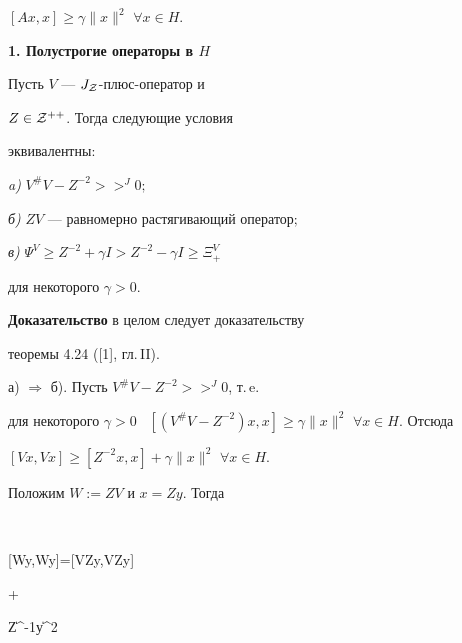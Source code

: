 $[Ax,x]\geq\gamma\| x\|^{2}$ $\forall x\in H$.


\bigskip





\begin{center}


{\bf 1. Полустрогие операторы в $H$}


\end{center}





\begin{thm}


Пусть $V$ --- $J_{\cal Z}$-плюс-оператор и


$Z\in {\cal Z}^{++}$. Тогда следующие условия


эквивалентны\/${:}$





{\em a)} $V^{\#}V-Z^{-2}>>^{J}0;$





{\em б)} $ZV$ --- равномерно растягивающий оператор$;$





{\em в)} $\Psi^{V}\geq Z^{-2}+\gamma I>Z^{-2}-\gamma I\geq\Xi^{V}_{+}$


для некоторого $\gamma >0$.


\end{thm}





{\bf Доказательство} в целом следует доказательству


теоремы 4.24 ([1], гл.\,II).





а) $\Rightarrow$ б). Пусть $V^{\#}V-Z^{-2}>>^{J} 0$, т.\,e.


для некоторого $\gamma >0$ \ $[(V^{\#}V-Z^{-2})x,x]\geq


\gamma \| x\|^{2}$ $\forall x\in H$. Отсюда 


$[Vx,Vx]\geq [Z^{-2}x,x]+\gamma\| x\|^{2}$ $\forall x\in H$.


Положим $W:=ZV$ и $x=Zy$. Тогда


$$


[Wy,Wy]=[VZy,VZy]


\geq [Z^{-2}Zy,Zy]+\gamma


\| Z^{-1}y\|^{2}



